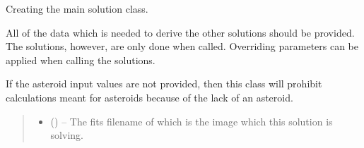 \documentclass[letterpaper,11pt,english]{sphinxmanual}
\begin{document}
\begin{savenotes}
\begin{fulllineitems}
\begin{savenotes}\begin{fulllineitems}
\label{\detokenize{code/opihiexarata.opihi.solution:opihiexarata.opihi.solution.OpihiSolution.__init__}}
\pysigstartsignatures
{}
\pysigstopsignatures
\sphinxAtStartPar
Creating the main solution class.

\sphinxAtStartPar
All of the data which is needed to derive the other solutions should
be provided. The solutions, however, are only done when called.
Overriding parameters can be applied when calling the solutions.

\sphinxAtStartPar
If the asteroid input values are not provided, then this class will
prohibit calculations meant for asteroids because of the lack
of an asteroid.
\begin{quote}\begin{description}
\begin{itemize}
\item {} 
\sphinxAtStartPar
{} () – The fits filename of which is the image which this solution is
solving.


\end{itemize}
\end{description}
\end{quote}
\end{fulllineitems}
\end{savenotes}
\end{fulllineitems}
\end{savenotes}
\end{document}

